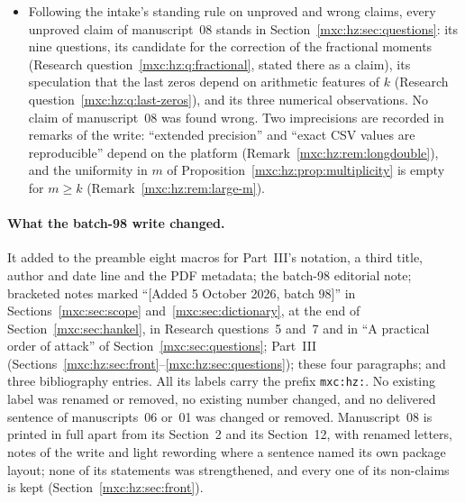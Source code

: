\documentclass[11pt]{article}
\numberwithin{equation}{section}
\theoremstyle{definition}
\theoremstyle{remark}
\begin{document}
\begin{itemize}
\item Following the intake's standing rule on unproved and wrong claims,
 every unproved claim of manuscript~08 stands in
 Section~\ref{mxc:hz:sec:questions}: its nine questions, its candidate for
 the correction of the fractional moments (Research
 question~\ref{mxc:hz:q:fractional}, stated there as a claim), its
 speculation that the last zeros depend on arithmetic features of $k$
 (Research question~\ref{mxc:hz:q:last-zeros}), and its three numerical
 observations. No claim of manuscript~08 was found wrong. Two imprecisions
 are recorded in remarks of the write: ``extended precision'' and
 ``exact CSV values are reproducible'' depend on the platform
 (Remark~\ref{mxc:hz:rem:longdouble}), and the uniformity in $m$ of
 Proposition~\ref{mxc:hz:prop:multiplicity} is empty for $m\ge k$
 (Remark~\ref{mxc:hz:rem:large-m}).
\end{itemize}

\paragraph{What the batch-98 write changed.} It added to the preamble eight
macros for Part~III's notation, a third title, author and date line and the
PDF metadata; the batch-98 editorial note; bracketed notes marked
``[Added 5 October 2026, batch 98]'' in Sections~\ref{mxc:sec:scope}
and~\ref{mxc:sec:dictionary}, at the end of Section~\ref{mxc:sec:hankel}, in
Research questions~5 and~7 and in ``A practical order of attack'' of
Section~\ref{mxc:sec:questions}; Part~III
(Sections~\ref{mxc:hz:sec:front}--\ref{mxc:hz:sec:questions}); these four
paragraphs; and three bibliography entries. All its labels carry the prefix
\texttt{mxc:hz:}. No existing label was renamed or removed, no existing
number changed, and no delivered sentence of manuscripts~06 or~01 was
changed or removed. Manuscript~08 is printed in full apart from its
Section~2 and its Section~12, with renamed letters, notes of the write and
light rewording where a sentence named its own package layout; none of its
statements was strengthened, and every one of its non-claims is kept
(Section~\ref{mxc:hz:sec:front}).
\end{document}
